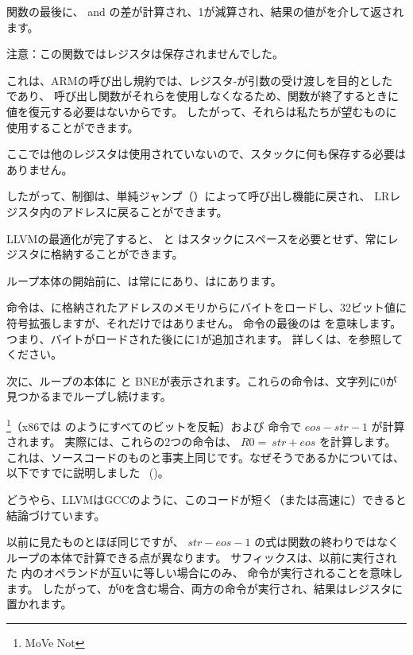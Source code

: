 関数の最後に、
 and の差が計算され、1が減算され、結果の値がを介して返されます。

注意：この関数ではレジスタは保存されませんでした。

これは、ARMの呼び出し規約では、レジスタ-が引数の受け渡しを目的とした であり、
呼び出し関数がそれらを使用しなくなるため、関数が終了するときに値を復元する必要はないからです。
したがって、それらは私たちが望むものに使用することができます。

ここでは他のレジスタは使用されていないので、スタックに何も保存する必要はありません。

したがって、制御は、単純ジャンプ（）によって呼び出し機能に戻され、
\ac{LR}レジスタ内のアドレスに戻ることができます。

\mysubparagraph{\OptimizingXcodeIV (\ThumbMode)}



LLVMの最適化が完了すると、 と はスタックにスペースを必要とせず、常にレジスタに格納することができます。

ループ本体の開始前に、は常ににあり、はにあります。

命令は、に格納されたアドレスのメモリからにバイトをロードし、32ビット値に符号拡張しますが、それだけではありません。
命令の最後のは を意味します。つまり、バイトがロードされた後にに1が追加されます。
詳しくは、を参照してください。

次に、ループの本体に \CMP と \ac{BNE}が表示されます。これらの命令は、文字列に0が見つかるまでループし続けます。

\footnote{MoVe Not}（x86では \NOT のようにすべてのビットを反転）および \ADD 命令で $eos - str - 1$ が計算されます。
実際には、これらの2つの命令は、 $R0 = ~str + eos$ を計算します。
これは、ソースコードのものと事実上同じです。なぜそうであるかについては、以下ですでに説明しました
~()。

どうやら、LLVMはGCCのように、このコードが短く（または高速に）できると結論づけています。

\mysubparagraph{\OptimizingKeilVI (\ARMMode)}




以前に見たものとほぼ同じですが、 $str - eos - 1$ の式は関数の終わりではなく
ループの本体で計算できる点が異なります。 
サフィックスは、以前に実行された \CMP 内のオペランドが互いに等しい場合にのみ、
命令が実行されることを意味します。 
したがって、が0を含む場合、両方の命令が実行され、結果はレジスタに置かれます。
